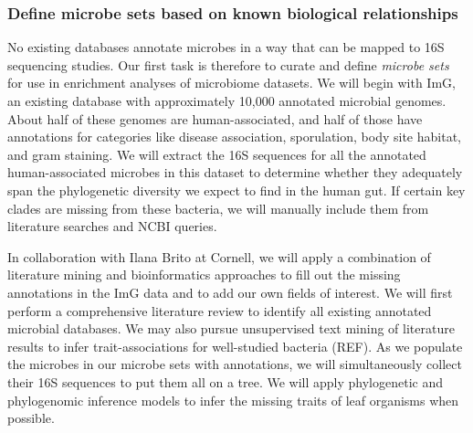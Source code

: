 \documentclass[12pt]{article}
\begin{document}
\subsubsection{Define microbe sets based on known biological relationships}


No existing databases annotate microbes in a way that can be mapped to 16S sequencing studies. Our first task is therefore to curate and define \textit{microbe sets} for use in enrichment analyses of microbiome datasets. We will begin with ImG, an existing database with approximately 10,000 annotated microbial genomes. About half of these genomes are human-associated, and half of those have annotations for categories like disease association, sporulation, body site habitat, and gram staining. We will extract the 16S sequences for all the annotated human-associated microbes in this dataset to determine whether they adequately span the phylogenetic diversity we expect to find in the human gut. If certain key clades are missing from these bacteria, we will manually include them from literature searches and NCBI queries.

In collaboration with Ilana Brito at Cornell, we will apply a combination of literature mining and bioinformatics approaches to fill out the missing annotations in the ImG data and to add our own fields of interest. We will first perform a comprehensive literature review to identify all existing annotated microbial databases. We may also pursue unsupervised text mining of literature results to infer trait-associations for well-studied bacteria (REF). As we populate the microbes in our microbe sets with annotations, we will simultaneously collect their 16S sequences to put them all on a tree. We will apply phylogenetic and phylogenomic inference models to infer the missing traits of leaf organisms when possible.
\end{document}
